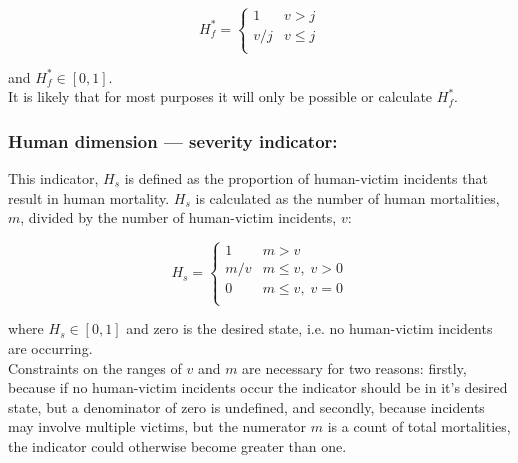 \documentclass[fleqn,10pt]{olplainarticle}
\begin{document}
\begin{equation*}
    H_f^\ast = \begin{cases}
        1       & v > j \\
        v/j & v \le j \\
    \end{cases}
\end{equation*}

and $H_f^\ast \in [0,1]$.\\

It is likely that for most purposes it will only be possible or calculate $H_f^\ast$.\\


\subsubsection*{Human dimension --- severity indicator:}
This indicator, $H_s$ is defined as the proportion of human-victim incidents that result in human mortality. $H_s$ is calculated as the number of human mortalities, $m$, divided by the number of human-victim incidents, $v$:

\begin{equation*}
    H_s = \begin{cases}
        1   & m > v \\
        m/v & m \le v,\; v > 0 \\
        0   & m \le v,\; v = 0 \\
    \end{cases}
\end{equation*}



where $H_s \in [0,1]$ and zero is the desired state, i.e. no human-victim incidents are occurring. \\

Constraints on the ranges of $v$ and $m$ are necessary for two reasons: firstly, because if no human-victim incidents occur the indicator should be in it's desired state, but a denominator of zero is undefined, and secondly,  because incidents may involve multiple victims, but the numerator $m$ is a count of total mortalities, the indicator could otherwise become greater than one.\\
\end{document}
